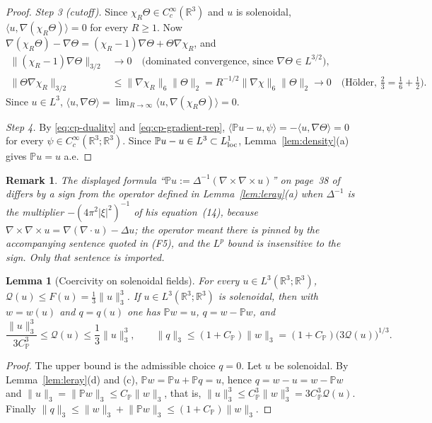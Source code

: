 \documentclass[11pt]{article}
\newtheorem{remark}[theorem]{Remark}
\newtheorem{lemma}[theorem]{Lemma}
\theoremstyle{definition}
\theoremstyle{plain}
\newcommand{\R}{\mathbb R}
\newcommand{\norm}[1]{\lVert #1\rVert}
\begin{document}
\begin{proof}
\emph{Step 3 (cutoff).}  Since $\chi_R\Theta\in C_c^\infty(\R^3)$ and $u$ is
solenoidal, $\langle u,\nabla(\chi_R\Theta)\rangle=0$ for every $R\ge1$.
Now $\nabla(\chi_R\Theta)-\nabla\Theta=(\chi_R-1)\nabla\Theta+\Theta\nabla\chi_R$,
and
\begin{align*}
 \norm{(\chi_R-1)\nabla\Theta}_{3/2}&\longrightarrow0
 \quad\text{(dominated convergence, since }\nabla\Theta\in L^{3/2}),\\
 \norm{\Theta\nabla\chi_R}_{3/2}&\le\norm{\nabla\chi_R}_6\norm\Theta_2
 =R^{-1/2}\norm{\nabla\chi}_6\norm\Theta_2\longrightarrow0
 \quad\text{(H\"older, }\tfrac23=\tfrac16+\tfrac12).
\end{align*}
Since
$u\in L^3$, $\langle u,\nabla\Theta\rangle=\lim_{R\to\infty}\langle u,\nabla(\chi_R\Theta)\rangle=0$.

\emph{Step 4.}  By \eqref{eq:cp-duality} and \eqref{eq:cp-gradient-rep},
$\langle\mathbb Pu-u,\psi\rangle=-\langle u,\nabla\Theta\rangle=0$ for
every $\psi\in C_c^\infty(\R^3;\R^3)$.  Since $\mathbb Pu-u\in L^3\subset L^1_{\rm loc}$,
Lemma~\ref{lem:density}(a) gives $\mathbb Pu=u$ a.e.
\end{proof}

\begin{remark}
The displayed formula ``$\mathbb Pu:=\Delta^{-1}(\nabla\times\nabla\times u)$''
on page~38 of \cite{Tao2013} differs by a sign from the operator defined
in Lemma~\ref{lem:leray}(a) when $\Delta^{-1}$ is the multiplier
$-(4\pi^2|\xi|^2)^{-1}$ of his equation~(14), because
$\nabla\times\nabla\times u=\nabla(\nabla\cdot u)-\Delta u$; the operator
meant there is pinned by the accompanying sentence quoted in (F5), and the
$L^p$ bound is insensitive to the sign.  Only that sentence is imported.
\end{remark}

\begin{lemma}[Coercivity on solenoidal fields]\label{lem:quotient-coercive}
For every $u\in L^3(\R^3;\R^3)$, $\mathcal Q(u)\le F(u)=\frac13\norm u_3^3$.
If $u\in L^3(\R^3;\R^3)$ is solenoidal, then with $w=w(u)$ and
$q=q(u)$ one has $\mathbb Pw=u$, $q=w-\mathbb Pw$, and
\begin{equation}\label{eq:cp-coercive}
 \frac{\norm u_3^3}{3C_{\mathbb P}^3}\le\mathcal Q(u)\le\frac13\norm u_3^3,
 \qquad
 \norm q_3\le(1+C_{\mathbb P})\norm w_3
 =(1+C_{\mathbb P})\bigl(3\mathcal Q(u)\bigr)^{1/3} .
\end{equation}
\end{lemma}

\begin{proof}
The upper bound is the admissible choice $q=0$.  Let $u$ be solenoidal.
By Lemma~\ref{lem:leray}(d) and (c), $\mathbb Pw=\mathbb Pu+\mathbb Pq=u$,
hence $q=w-u=w-\mathbb Pw$ and
$\norm u_3=\norm{\mathbb Pw}_3\le C_{\mathbb P}\norm w_3$, that is,
$\norm u_3^3\le C_{\mathbb P}^3\norm w_3^3=3C_{\mathbb P}^3\mathcal Q(u)$.
Finally $\norm q_3\le\norm w_3+\norm{\mathbb Pw}_3\le(1+C_{\mathbb P})\norm w_3$.
\end{proof}
\end{document}
